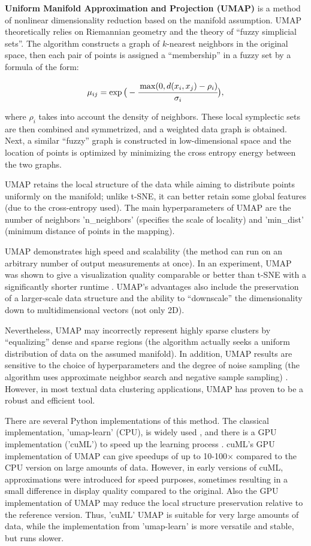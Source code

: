 \textbf{Uniform Manifold Approximation and Projection (UMAP)} is a method of nonlinear dimensionality reduction
based on the manifold assumption. UMAP theoretically relies on Riemannian geometry and the theory
of “fuzzy simplicial sets”. The algorithm constructs a graph of $k$-nearest neighbors
in the original space, then each pair of points is assigned a “membership” in a fuzzy set by a formula of the form:

\begin{equation}
    \mu_{ij}=\exp\big(-\cfrac{\max(0, d(x_i, x_j) - \rho_i)}{\sigma_i}\big),
\end{equation}

where $\rho_i$ takes into account the density of neighbors. These local symplectic sets are then combined
and symmetrized, and a weighted data graph is obtained. Next, a similar “fuzzy” graph is constructed in
low-dimensional space and the location of points is optimized by minimizing the cross entropy energy between
the two graphs.

UMAP retains the local structure of the data while aiming to distribute points uniformly on the manifold;
unlike t-SNE, it can better retain some global features (due to the cross-entropy used). The main hyperparameters
of UMAP are the number of neighbors 'n\_neighbors' (specifies the scale of locality) and 'min\_dist'
(minimum distance of points in the mapping).

UMAP demonstrates high speed and scalability (the method can run on an arbitrary number of output measurements
at once). In an experiment, UMAP was shown to give a visualization quality comparable or better than t-SNE
with a significantly shorter runtime \parencite{UMAP2018mcinnes}. UMAP's advantages also include the preservation
of a larger-scale data structure and the ability to “downscale” the dimensionality down to multidimensional
vectors (not only 2D).

Nevertheless, UMAP may incorrectly represent highly sparse clusters by “equalizing” dense and sparse regions
(the algorithm actually seeks a uniform distribution of data on the assumed manifold). In addition, UMAP
results are sensitive to the choice of hyperparameters and the degree of noise sampling (the algorithm uses
approximate neighbor search and negative sample sampling) \parencite{huang2022towards}. However, in most textual
data clustering applications, UMAP has proven to be a robust and efficient tool.

There are several Python implementations of this method. The classical implementation, 'umap-learn' (CPU),
is widely used \parencite{mcinnes2018umap-software}, and there is a GPU implementation ('cuML') to speed
up the learning process \parencite{cuml2020machine}. cuML's GPU implementation of UMAP can give speedups
of up to 10-100× compared to the CPU version on large amounts of data. However, in early versions of cuML,
approximations were introduced for speed purposes, sometimes resulting in a small difference in display
quality compared to the original. Also the GPU implementation of UMAP may reduce the local structure preservation
relative to the reference version. Thus, 'cuML' UMAP is suitable for very large amounts of data, while
the implementation from 'umap-learn' is more versatile and stable, but runs slower.

